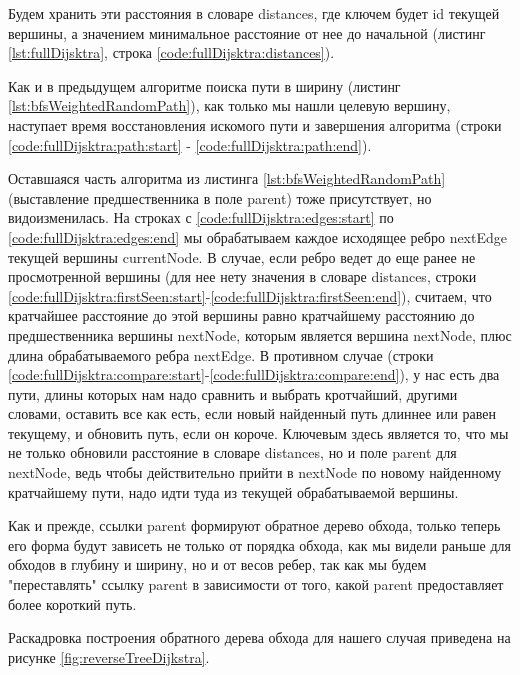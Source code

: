 \documentclass[../article.tex]{subfiles}
\begin{document}
Будем хранить эти расстояния в словаре {\firacodebold distances}, где ключем будет {\firacodebold id} текущей вершины, а значением минимальное расстояние от нее до начальной (листинг \ref{lst:fullDijsktra}, строка \ref{code:fullDijsktra:distances}).

Как и в предыдущем алгоритме поиска пути в ширину (листинг \ref{lst:bfsWeightedRandomPath}), как только мы нашли целевую вершину, наступает время восстановления искомого пути и завершения алгоритма (строки \ref{code:fullDijsktra:path:start} - \ref{code:fullDijsktra:path:end}).

Оставшаяся часть алгоритма из листинга \ref{lst:bfsWeightedRandomPath} (выставление предшественника в поле {\firacodebold parent}) тоже присутствует, но видоизменилась. На строках с \ref{code:fullDijsktra:edges:start} по \ref{code:fullDijsktra:edges:end} мы обрабатываем каждое исходящее ребро {\firacodebold nextEdge} текущей вершины {\firacodebold currentNode}. В случае, если ребро ведет до еще ранее не просмотренной вершины (для нее нету значения в словаре {\firacodebold distances}, строки \ref{code:fullDijsktra:firstSeen:start}-\ref{code:fullDijsktra:firstSeen:end}), считаем, что кратчайшее расстояние до этой вершины равно кратчайшему расстоянию до предшественника вершины {\firacodebold nextNode}, которым является вершина {\firacodebold nextNode}, плюс длина обрабатываемого ребра {\firacodebold nextEdge}. В противном случае (строки \ref{code:fullDijsktra:compare:start}-\ref{code:fullDijsktra:compare:end}), у нас есть два пути, длины которых нам надо сравнить и выбрать кротчайший, другими словами, оставить все как есть, если новый найденный путь длиннее или равен текущему, и обновить путь, если он короче. Ключевым здесь является то, что мы не только обновили расстояние в словаре {\firacodebold distances}, но и поле {\firacodebold parent} для {\firacodebold nextNode}, ведь чтобы действительно прийти в nextNode по новому найденному кратчайшему пути, надо идти туда из текущей обрабатываемой вершины.

Как и прежде, ссылки {\firacodebold parent} формируют обратное дерево обхода, только теперь его форма будут зависеть не только от порядка обхода, как мы видели раньше для обходов в глубину и ширину, но и от весов ребер, так как мы будем "переставлять" ссылку {\firacodebold parent} в зависимости от того, какой {\firacodebold parent} предоставляет более короткий путь.

Раскадровка построения обратного дерева обхода для нашего случая приведена на рисунке \ref{fig:reverseTreeDijkstra}.
\end{document}
